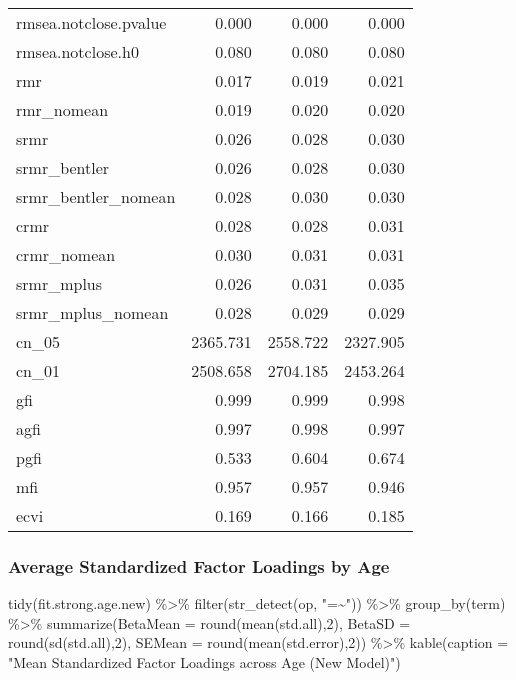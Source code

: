 \documentclass[
  letterpaper,
  DIV=11,
  numbers=noendperiod]{scrartcl}
\newenvironment{Shaded}{\begin{snugshade}}{\end{snugshade}}
\newcommand{\AttributeTok}[1]{\textcolor[rgb]{0.40,0.45,0.13}{#1}}
\newcommand{\DecValTok}[1]{\textcolor[rgb]{0.68,0.00,0.00}{#1}}
\newcommand{\FunctionTok}[1]{\textcolor[rgb]{0.28,0.35,0.67}{#1}}
\newcommand{\NormalTok}[1]{\textcolor[rgb]{0.00,0.23,0.31}{#1}}
\newcommand{\SpecialCharTok}[1]{\textcolor[rgb]{0.37,0.37,0.37}{#1}}
\newcommand{\StringTok}[1]{\textcolor[rgb]{0.13,0.47,0.30}{#1}}
\begin{document}
\begin{longtable}[]{@{}lrrr@{}}
rmsea.notclose.pvalue & 0.000 & 0.000 & 0.000 \\
rmsea.notclose.h0 & 0.080 & 0.080 & 0.080 \\
rmr & 0.017 & 0.019 & 0.021 \\
rmr\_nomean & 0.019 & 0.020 & 0.020 \\
srmr & 0.026 & 0.028 & 0.030 \\
srmr\_bentler & 0.026 & 0.028 & 0.030 \\
srmr\_bentler\_nomean & 0.028 & 0.030 & 0.030 \\
crmr & 0.028 & 0.028 & 0.031 \\
crmr\_nomean & 0.030 & 0.031 & 0.031 \\
srmr\_mplus & 0.026 & 0.031 & 0.035 \\
srmr\_mplus\_nomean & 0.028 & 0.029 & 0.029 \\
cn\_05 & 2365.731 & 2558.722 & 2327.905 \\
cn\_01 & 2508.658 & 2704.185 & 2453.264 \\
gfi & 0.999 & 0.999 & 0.998 \\
agfi & 0.997 & 0.998 & 0.997 \\
pgfi & 0.533 & 0.604 & 0.674 \\
mfi & 0.957 & 0.957 & 0.946 \\
ecvi & 0.169 & 0.166 & 0.185 \\
\end{longtable}

\subsubsection{Average Standardized Factor Loadings by
Age}\label{average-standardized-factor-loadings-by-age}

\begin{Shaded}
\begin{Highlighting}[]
\FunctionTok{tidy}\NormalTok{(fit.strong.age.new) }\SpecialCharTok{\%\textgreater{}\%}
  \FunctionTok{filter}\NormalTok{(}\FunctionTok{str\_detect}\NormalTok{(op, }\StringTok{"=\textasciitilde{}"}\NormalTok{)) }\SpecialCharTok{\%\textgreater{}\%}
  \FunctionTok{group\_by}\NormalTok{(term) }\SpecialCharTok{\%\textgreater{}\%}
  \FunctionTok{summarize}\NormalTok{(}\AttributeTok{BetaMean =} \FunctionTok{round}\NormalTok{(}\FunctionTok{mean}\NormalTok{(std.all),}\DecValTok{2}\NormalTok{), }
            \AttributeTok{BetaSD =} \FunctionTok{round}\NormalTok{(}\FunctionTok{sd}\NormalTok{(std.all),}\DecValTok{2}\NormalTok{), }
            \AttributeTok{SEMean =} \FunctionTok{round}\NormalTok{(}\FunctionTok{mean}\NormalTok{(std.error),}\DecValTok{2}\NormalTok{)) }\SpecialCharTok{\%\textgreater{}\%}
  \FunctionTok{kable}\NormalTok{(}\AttributeTok{caption =} \StringTok{"Mean Standardized Factor Loadings across Age (New Model)"}\NormalTok{)}
\end{Highlighting}
\end{Shaded}
\end{document}

